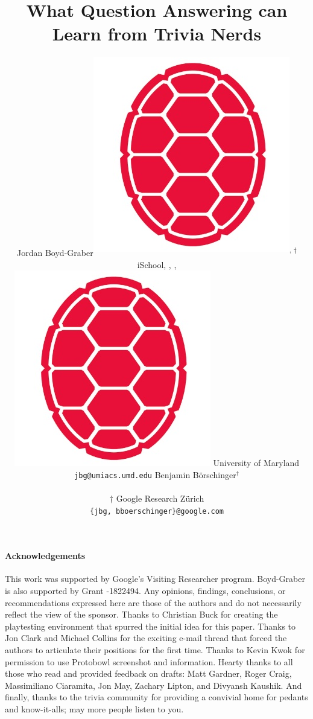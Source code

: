 \documentclass[table,11pt,a4]{article}
\title{What Question Answering can Learn from Trivia Nerds}
\author{ Jordan Boyd-Graber\textsuperscript{\includegraphics[scale=0.02]{2020_acl_trivia_tournament/figures/redshell}, $\dagger$} \\
iSchool, \abr{cs}, \abr{umiacs}, \abr{lsc} \\
\includegraphics[scale=0.03]{2020_acl_trivia_tournament/figures/redshell} University of Maryland \\ 
\texttt{jbg@umiacs.umd.edu} \And
 Benjamin B\"orschinger$^\dagger$ \\
\\
$\dagger$ Google Research Z\"urich\\
\hphantom{\dots\dots\dots\dots}\texttt{\{jbg, bboerschinger\}@google.com}\hphantom{\dots\dots}}
\newcommand{\latexfile}[1]{}
\begin{document}
\maketitle

\latexfile{00-abstract}
\latexfile{10-intro}
\latexfile{20-tournaments}
\latexfile{30-craft}
\latexfile{60-qb}
\latexfile{90-call}

\paragraph{Acknowledgements}
\begin{footnotesize}

This work was supported by Google's Visiting Researcher program.
Boyd-Graber is also supported by  Grant -1822494.
Any opinions, findings,
conclusions, or recommendations expressed here are those of the
authors and do not necessarily reflect the view of the sponsor.
Thanks to Christian Buck for creating the  playtesting environment that spurred the initial idea for this paper.
Thanks to Jon Clark and Michael Collins for the exciting e-mail thread that forced the authors to articulate their positions for the first time.
Thanks to Kevin Kwok for permission to use Protobowl screenshot and information.
Hearty thanks to all those who read and provided feedback on drafts: 
Matt Gardner,
Roger Craig,
Massimiliano Ciaramita, 
Jon May,
Zachary Lipton,
and Divyansh Kaushik.
And finally, thanks to the trivia community for providing a convivial home for pedants and know-it-alls; may more people listen to you.
\end{footnotesize}




\clearpage
\setcounter{section}{0}
\renewcommand{\thesection}{\Alph{section}} 
\latexfile{appendix}
\end{document}
